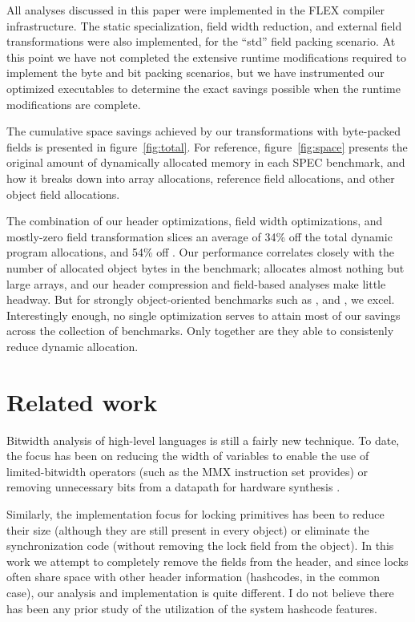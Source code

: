 \documentclass[preprint]{acmconf}
\begin{document}
All analyses discussed in this paper were implemented in the FLEX
compiler infrastructure.  The static specialization, field width
reduction, and external field transformations were also implemented,
for the ``std'' field packing scenario.  At this point we have not
completed the extensive runtime modifications required to implement
the byte and bit packing scenarios, but we have instrumented our
optimized executables to determine the exact savings possible when the
runtime modifications are complete.

The cumulative space savings achieved by our transformations with
byte-packed fields is presented in figure~\ref{fig:total}.  For
reference, figure~\ref{fig:space} presents the original amount of
dynamically allocated memory in each SPEC benchmark, and how it breaks
down into array allocations, reference field allocations, and other
object field allocations.

The combination of our header optimizations, field width
optimizations, and mostly-zero field transformation slices an average
of 34\% off the total dynamic program allocations, and 54\% off
.  Our performance correlates closely with the
number of allocated object bytes in the benchmark; 
allocates almost nothing but large arrays, and our header compression
and field-based analyses make little headway.  But for strongly
object-oriented benchmarks such as ,
 and , we excel.  Interestingly
enough, no single optimization serves to attain most of our savings
across the collection of benchmarks.  Only together are they able to
consistenly reduce dynamic allocation.



\section{Related work}
Bitwidth analysis of high-level languages is still a fairly new
technique.  To date, the focus has been on
reducing the width of variables to enable the use of limited-bitwidth
operators (such as the MMX instruction set provides)
or removing unnecessary bits from a datapath for
hardware synthesis \cite{stephenson00,ananian:siliconc}.

Similarly, the implementation focus for locking primitives has been to
reduce their size \cite{bacon98} (although they are still present in
every object) or eliminate the synchronization code
\cite{salcianu01} (without removing the lock field from the object).
In this work we attempt to completely remove the fields from the
header, and since locks often share space with other
header information (hashcodes, in the common case), our analysis and
implementation is quite different.  I do not believe there has been
any prior study of the utilization of the system hashcode features.
\end{document}
